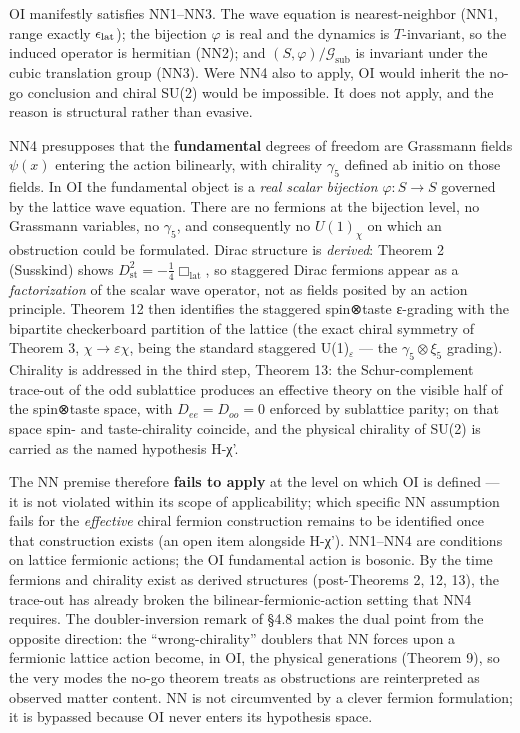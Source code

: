 \documentclass[
]{article}
\begin{document}
OI manifestly satisfies NN1--NN3. The wave equation is nearest-neighbor
(NN1, range exactly \(\epsilon_{\rm lat}\)); the bijection \(\varphi\)
is real and the dynamics is \(T\)-invariant, so the induced operator is
hermitian (NN2); and \((S,\varphi)/\mathcal{G}_{\text{sub}}\) is
invariant under the cubic translation group (NN3). Were NN4 also to
apply, OI would inherit the no-go conclusion and chiral SU(2) would be
impossible. It does not apply, and the reason is structural rather than
evasive.

NN4 presupposes that the \textbf{fundamental} degrees of freedom are
Grassmann fields \(\psi(x)\) entering the action bilinearly, with
chirality \(\gamma_5\) defined ab initio on those fields. In OI the
fundamental object is a \emph{real scalar bijection}
\(\varphi: S \to S\) governed by the lattice wave equation. There are no
fermions at the bijection level, no Grassmann variables, no
\(\gamma_5\), and consequently no \(U(1)_\chi\) on which an obstruction
could be formulated. Dirac structure is \emph{derived}: Theorem 2
(Susskind) shows \(D_{\text{st}}^2 = -\tfrac14\Box_{\text{lat}}\), so
staggered Dirac fermions appear as a \emph{factorization} of the scalar
wave operator, not as fields posited by an action principle. Theorem 12
then identifies the staggered spin⊗taste ε-grading with the bipartite
checkerboard partition of the lattice (the exact chiral symmetry of
Theorem 3, \(\chi \to \varepsilon\chi\), being the standard staggered
U(1)\(_\varepsilon\) --- the \(\gamma_5 \otimes \xi_5\) grading).
Chirality is addressed in the third step, Theorem 13: the
Schur-complement trace-out of the odd sublattice produces an effective
theory on the visible half of the spin⊗taste space, with
\(D_{ee}=D_{oo}=0\) enforced by sublattice parity; on that space spin-
and taste-chirality coincide, and the physical chirality of SU(2) is
carried as the named hypothesis H-χ'.

The NN premise therefore \textbf{fails to apply} at the level on which
OI is defined --- it is not violated within its scope of applicability;
which specific NN assumption fails for the \emph{effective} chiral
fermion construction remains to be identified once that construction
exists (an open item alongside H-χ'). NN1--NN4 are conditions on lattice
fermionic actions; the OI fundamental action is bosonic. By the time
fermions and chirality exist as derived structures (post-Theorems 2, 12,
13), the trace-out has already broken the bilinear-fermionic-action
setting that NN4 requires. The doubler-inversion remark of §4.8 makes
the dual point from the opposite direction: the ``wrong-chirality''
doublers that NN forces upon a fermionic lattice action become, in OI,
the physical generations (Theorem 9), so the very modes the no-go
theorem treats as obstructions are reinterpreted as observed matter
content. NN is not circumvented by a clever fermion formulation; it is
bypassed because OI never enters its hypothesis space.
\end{document}
